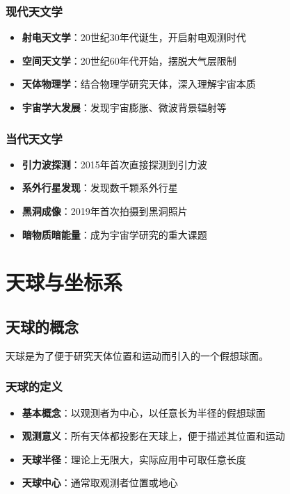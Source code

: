 \documentclass[12pt,UTF8]{ctexbook}
\begin{document}
\subsection{现代天文学}

\begin{itemize}
  \item \textbf{射电天文学}：20世纪30年代诞生，开启射电观测时代
  \item \textbf{空间天文学}：20世纪60年代开始，摆脱大气层限制
  \item \textbf{天体物理学}：结合物理学研究天体，深入理解宇宙本质
  \item \textbf{宇宙学大发展}：发现宇宙膨胀、微波背景辐射等
\end{itemize}

\subsection{当代天文学}

\begin{itemize}
  \item \textbf{引力波探测}：2015年首次直接探测到引力波
  \item \textbf{系外行星发现}：发现数千颗系外行星
  \item \textbf{黑洞成像}：2019年首次拍摄到黑洞照片
  \item \textbf{暗物质暗能量}：成为宇宙学研究的重大课题
\end{itemize}

\chapter{天球与坐标系}
\section{天球的概念}

天球是为了便于研究天体位置和运动而引入的一个假想球面。

\subsection{天球的定义}

\begin{itemize}
  \item \textbf{基本概念}：以观测者为中心，以任意长为半径的假想球面
  \item \textbf{观测意义}：所有天体都投影在天球上，便于描述其位置和运动
  \item \textbf{天球半径}：理论上无限大，实际应用中可取任意长度
  \item \textbf{天球中心}：通常取观测者位置或地心
\end{itemize}
\end{document}
